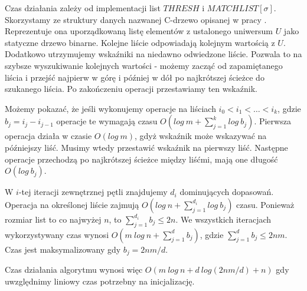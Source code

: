 \documentclass[11pt]{article}
\begin{document}
Czas działania zależy od implementacji list $THRESH$ i $MATCHLIST[\sigma]$. Skorzystamy ze struktury danych nazwanej C-drzewo opisanej w pracy \cite{apostolico1987longest}. Reprezentuje ona uporządkowaną listę elementów z ustalonego uniwersum $U$ jako statyczne drzewo binarne. Kolejne liście odpowiadają kolejnym wartością z $U$. Dodatkowo utrzymujemy wskaźniki na niedawno odwiedzone liście. Pozwala to na szybsze wyszukiwanie kolejnych wartości - możemy zacząć od zapamiętanego liścia i przejść najpierw w górę i później w dół po najkrótszej ścieżce do szukanego liścia. Po zakończeniu operacji przestawiamy ten wskaźnik.

Możemy pokazać, że jeśli wykonujemy operacje na liściach $i_0 < i_1 < \dots < i_k$, gdzie $b_j = i_j - i_{j-1}$ operacje te wymagają czasu $O(log\ m + \sum_{j=1}^k log\ b_j)$. Pierwsza operacja działa w czasie $O(log\ m)$, gdyż wskaźnik może wskazywać na późniejszy liść. Musimy wtedy przestawić wskaźnik na pierwszy liść. Następne operacje przechodzą po najkrótszej ścieżce między liśćmi, mają one długość $O(log\ b_j)$. 

W $i$-tej iteracji zewnętrznej pętli znajdujemy $d_i$ dominujących dopasowań. Operacja na określonej liście zajmują $O(log\ n + \sum_{j=1}^{d_i} log\ b_j)$ czasu. Ponieważ rozmiar list to co najwyżej $n$, to $\sum_{j=1}^{d_i} b_j \le 2n$. We wszystkich iteracjach wykorzystywany czas wynosi $O(m\ log\ n + \sum_{j=1}^d b_j)$, gdzie $\sum_{j=1}^d b_j \le 2nm$. Czas jest maksymalizowany gdy $b_j = 2nm/d$. 

Czas działania algorytmu wynosi więc $O(m\ log\ n + d\ log(2nm/d) + n)$ gdy uwzględnimy liniowy czas potrzebny na inicjalizację. 



\end{document}
